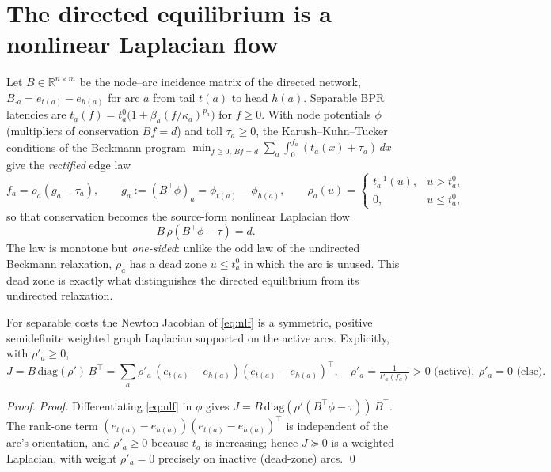 \documentclass[ijoc]{informs3}
\newcommand{\R}{\mathbb{R}}
\begin{document}
\section{The directed equilibrium is a nonlinear Laplacian flow}\label{sec:formulation}
Let $B\in\R^{n\times m}$ be the node--arc incidence matrix of the directed network, $B_{\cdot a}=e_{t(a)}-e_{h(a)}$
for arc $a$ from tail $t(a)$ to head $h(a)$. Separable BPR latencies are $t_a(f)=t^0_a\big(1+\beta_a(f/\kappa_a)^{p_a}\big)$
for $f\ge 0$. With node potentials $\phi$ (multipliers of conservation $Bf=d$) and toll $\tau_a\ge0$, the
Karush--Kuhn--Tucker conditions of the Beckmann program $\min_{f\ge0,\,Bf=d}\sum_a\int_0^{f_a}(t_a(x)+\tau_a)\,dx$
give the \emph{rectified} edge law
\begin{equation}\label{eq:rho}
f_a=\rho_a(g_a-\tau_a),\qquad g_a:=(B^\top\phi)_a=\phi_{t(a)}-\phi_{h(a)},\qquad
\rho_a(u)=\begin{cases} t_a^{-1}(u), & u> t^0_a,\\[1pt] 0, & u\le t^0_a,\end{cases}
\end{equation}
so that conservation becomes the source-form nonlinear Laplacian flow
\begin{equation}\label{eq:nlf}
B\,\rho(B^\top\phi-\tau)=d .
\end{equation}
The law is monotone but \emph{one-sided}: unlike the odd law of the undirected Beckmann relaxation, $\rho_a$ has a
dead zone $u\le t^0_a$ in which the arc is unused. This dead zone is exactly what distinguishes the directed
equilibrium from its undirected relaxation.

\begin{proposition}\label{prop:laplacian}
For separable costs the Newton Jacobian of \cref{eq:nlf} is a symmetric, positive semidefinite weighted graph
Laplacian supported on the active arcs. Explicitly, with $\rho'_a\ge0$,
\[
J=B\,\mathrm{diag}(\rho')\,B^\top=\sum_{a}\rho'_a\,(e_{t(a)}-e_{h(a)})(e_{t(a)}-e_{h(a)})^\top ,
\quad \rho'_a=\tfrac{1}{t'_a(f_a)}>0 \text{ (active)},\ \rho'_a=0 \text{ (else)}.
\]
\end{proposition}
\begin{proof}{\it Proof.}
Differentiating \cref{eq:nlf} in $\phi$ gives $J=B\,\mathrm{diag}(\rho'(B^\top\phi-\tau))\,B^\top$. The rank-one
term $(e_{t(a)}-e_{h(a)})(e_{t(a)}-e_{h(a)})^\top$ is independent of the arc's orientation, and $\rho'_a\ge0$
because $t_a$ is increasing; hence $J\succeq0$ is a weighted Laplacian, with weight $\rho'_a=0$ precisely on
inactive (dead-zone) arcs. \qed
\end{proof}
\end{document}
